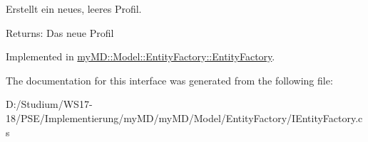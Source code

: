 Erstellt ein neues, leeres Profil. 

\begin{Desc}
\item[Returns:]Das neue Profil\end{Desc}


Implemented in \hyperlink{classmy_m_d_1_1_model_1_1_entity_factory_1_1_entity_factory_d81849285c0ecfe46b822095df995e8e}{my\-MD::Model::Entity\-Factory::Entity\-Factory}.

The documentation for this interface was generated from the following file:\begin{CompactItemize}
\item 
D:/Studium/WS17-18/PSE/Implementierung/my\-MD/my\-MD/Model/Entity\-Factory/IEntity\-Factory.cs\end{CompactItemize}
